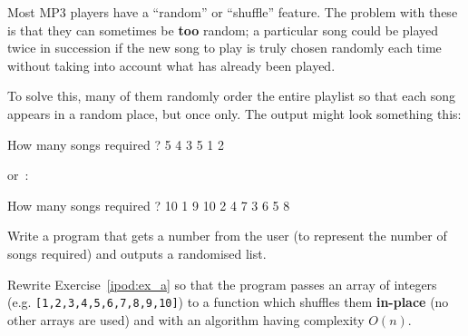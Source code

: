 
Most MP3 players have a ``random'' or ``shuffle'' feature.
The problem with these is that they can sometimes be {\bf too} random;
a particular song could be played twice in succession if the new song to
play is truly chosen randomly each time without taking into account what has already been played.

To solve this, many of them randomly order the entire playlist so that
each song appears in a random place, but once only.
The output might look something this:

\begin{terminaloutput}
How many songs required ? 5
4 3 5 1 2
\end{terminaloutput}

or~:

\begin{terminaloutput}
How many songs required ? 10
1 9 10 2 4 7 3 6 5 8
\end{terminaloutput}

\begin{exercise}\label{ipod:ex_a}
Write a program that gets a number from the user (to represent the number
of songs required) and outputs a randomised list.
\end{exercise}

\begin{exercise}
Rewrite Exercise~\ref{ipod:ex_a} so that the program passes an array of integers (e.g. \verb^[1,2,3,4,5,6,7,8,9,10]^) to a function which shuffles them {\bf in-place} (no other arrays are used) and with an algorithm having complexity $O(n)$. 
\end{exercise}
